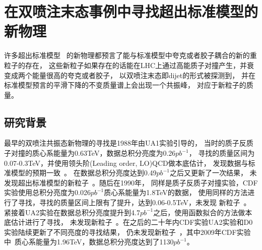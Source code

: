 
\chapter{在双喷注末态事例中寻找超出标准模型的新物理}
\label{cha:Dijet}



许多超出标准模型~\cite{qstar1,qstar2,zprime1,zprime3,wprime1,Chizhov:2009fc,Chizhov:2010jg,DM1,DM2,DM3,qbh1,qbh2,RS1,RS2}
的新物理都预言了能与标准模型中夸克或者胶子耦合的新的重粒子的存在，
这些新粒子如果存在的话能在LHC上通过高能质子对撞产生，并衰变成两个能量很高的夸克或者胶子，
以双喷注末态即dijet的形式被探测到，
并在标准模型预言的平滑下降的不变质量谱上会出现一个共振峰，
对应于新粒子的质量。

\section{研究背景}
\label{sec:DijetBKG}

最早的双喷注共振态新物理的寻找是1988年由UA1实验引导的，
当时的质子反质子对撞的质心系能量为0.63TeV，数据总积分亮度为0.26$pb^{-1}$，
寻找的质量区间为0.07-0.3TeV，并使用领头阶(Leading order, LO)QCD做本底估计，
发现数据与标准模型的预期一致~\cite{UA1}。
在数据总积分亮度达到0.49$pb^{-1}$之后又更新了一次结果，
未发现超出标准模型的新粒子~\cite{UA2}。随后在1990年，
同样是质子反质子对撞实验，CDF实验使用总积分亮度为0.026$pb^{-1}$质心系能量为1.8TeV的数据，
使用同样的方法进行了寻找，寻找的质量区间上限有了提升，达到0.06-0.5TeV，未发现
新粒子~\cite{CDF1}。
紧接着UA2实验在数据总积分亮度提升到4.7$pb^{-1}$之后，使用函数拟合的方法做本底估计进行了寻找，
未发现新粒子~\cite{UA3}。在之后的二十年内CDF实验UA2实验和D0实验陆续更新了不同亮度的寻找结果，
仍未发现新粒子~\cite{CDF2,UA4,CDF3,CDF4,D01,CDF5}，其中2009年CDF实验中~\cite{CDF5}质心系能量为1.96TeV，数据总积分亮度达到了1130$pb^{-1}$。

